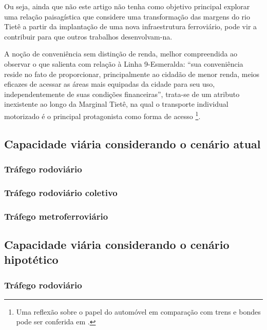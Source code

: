 \documentclass[
article,			%
11pt,				%
oneside,			%
a4paper,			%
english,			%
brazil,				%
sumario=tradicional
]{abntex2}
\begin{document}
	Ou seja, ainda que não este artigo não tenha como objetivo principal explorar uma relação paisagística que considere uma transformação das margens do rio Tietê a partir da implantação de uma nova infraestrutura ferroviário, pode vir a contribuir para que outros trabalhos desenvolvam-na.
	
	A noção de conveniência sem distinção de renda, melhor compreendida ao observar o que  salienta com relação à Linha 9-Esmeralda: ``sua conveniência reside no fato de proporcionar, principalmente ao cidadão de menor renda, meios eficazes de acessar as áreas mais equipadas da cidade para seu uso, independentemente de suas condições financeiras'', trata-se de um atributo inexistente ao longo da Marginal Tietê, na qual o transporte individual motorizado é o principal protagonista como forma de acesso \footnote{Uma reflexão sobre o papel do automóvel em comparação com trens e bondes pode ser conferida em \cite[p. 147--149]{franco2005a}.}.
	
	\subsection{Capacidade viária considerando o cenário atual} \label{s2:capacidadeatual}
	
	\subsubsection{Tráfego rodoviário} \label{s3:rodoatual}
	
	\subsubsection{Tráfego rodoviário coletivo} \label{s3:coletivoatual}
	
	\subsubsection{Tráfego metroferroviário} \label{s3:metroatual}
	
	\subsection{Capacidade viária considerando o cenário hipotético} \label{s2:capacidadefuturo}
	
	\subsubsection{Tráfego rodoviário} \label{s3:rodofuturo}
	
\end{document}
